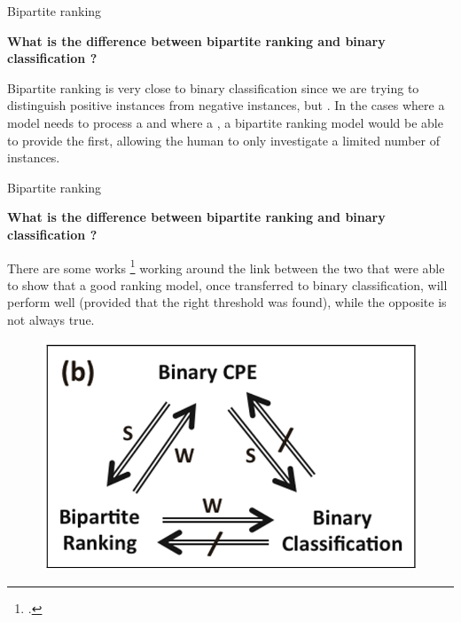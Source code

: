 \begin{frame}{Bipartite ranking}

    {\large\textbf{What is the difference between bipartite ranking and binary classification ?}}

    Bipartite ranking is very close to binary classification since we are trying to distinguish positive instances from negative instances, but . In the cases where a model needs to process a  and where a , a bipartite ranking model would be able to provide the  first, allowing the human to only investigate a limited number of instances.
    
\end{frame}

\begin{frame}{Bipartite ranking}

    {\large\textbf{What is the difference between bipartite ranking and binary classification ?}}

    There are some works \footcite{narasimhan2013relationship} working around the link between the two that were able to show that a good ranking model, once transferred to binary classification, will perform well (provided that the right threshold was found), while the opposite is not always true. 

    \begin{figure}
        \centering
        \includegraphics[scale=0.3]{images/link.png}
    \end{figure}
    
\end{frame}


